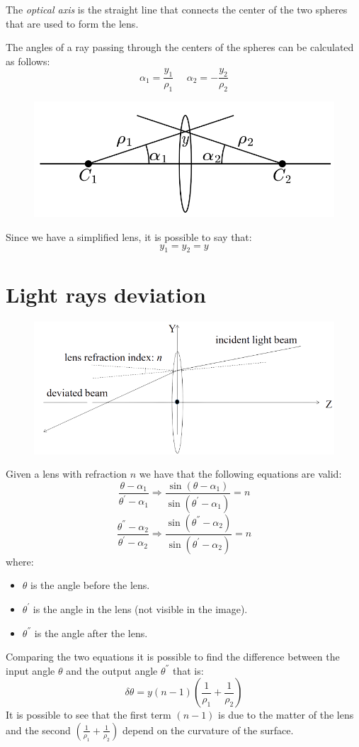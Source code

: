 \documentclass[12pt, a4paper]{report}
\begin{document}
    \begin{definition}
        The \emph{optical axis} is the straight line that connects the center of the two spheres that are used to form the lens. 
    \end{definition}
    The angles of a ray passing through the centers of the spheres can be calculated as follows: 
    \[\alpha_1=\dfrac{y_1}{\rho_1} \:\:\:\:\:\: \alpha_2=-\dfrac{y_2}{\rho_2}\]
    \begin{figure}[H]
        \centering
        \includegraphics[width=0.5\linewidth]{images/y.png}
    \end{figure}
    Since we have a simplified lens, it is possible to say that:
    \[y_1=y_2=y\]
    
    \section{Light rays deviation}
    \begin{figure}[H]
        \centering
       \includegraphics[width=0.5\linewidth]{images/ray.png}
   \end{figure}
    Given a lens with refraction $n$ we have that the following equations are valid:
    \[\dfrac{\theta-\alpha_1}{\theta^{'}-\alpha_1} \Rightarrow \dfrac{\sin{(\theta-\alpha_1)}}{\sin{(\theta^{'}-\alpha_1)}}=n\]
    \[\dfrac{\theta^{''}-\alpha_2}{\theta^{'}-\alpha_2} \Rightarrow \dfrac{\sin{(\theta^{''}-\alpha_2)}}{\sin{(\theta^{'}-\alpha_2)}}=n\]
    where:
    \begin{itemize}
        \item $\theta$ is the angle before the lens. 
        \item $\theta^{'}$ is the angle in the lens (not visible in the image). 
        \item $\theta^{''}$ is the angle after the lens.
    \end{itemize}
    Comparing the two equations it is possible to find the difference between the input angle $\theta$ and the output angle $\theta^{''}$ that is: 
    \[\delta \theta=y(n-1)\left( \dfrac{1}{\rho_1} + \dfrac{1}{\rho_2}\right)\]
    It is possible to see that the first term $(n-1)$ is due to the matter of the lens and the second $\left( \frac{1}{\rho_1} + \frac{1}{\rho_2}\right)$ depend on the curvature 
    of the surface. 
\end{document}
